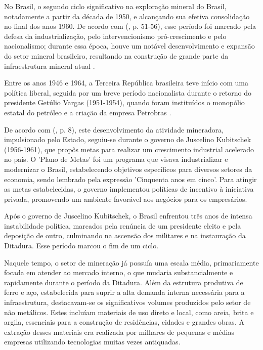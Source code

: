 No Brasil, o segundo ciclo significativo na exploração mineral do Brasil, notadamente a partir da década de 1950, e alcançando sua efetiva consolidação no final dos anos 1960. De acordo com \citeauthor{fonseca2012progresso} (\citeyear{fonseca2012progresso}, p. 51-56), esse período foi marcado pela defesa da industrialização, pelo intervencionismo pró-crescimento e pelo nacionalismo; durante essa época, houve um notável desenvolvimento e expansão do setor mineral brasileiro, resultando na construção de grande parte da infraestrutura mineral atual \cite[p. 5]{barreto2001mineracao}.

Entre os anos 1946 e 1964, a Terceira República brasileira teve início com uma política liberal, seguida por um breve período nacionalista durante o retorno do presidente Getúlio Vargas (1951-1954), quando foram instituídos o monopólio estatal do petróleo e a criação da empresa Petrobras \cite{villasboas1995mineracao}.

De acordo com \citeauthor{domingues2022historia} (\citeyear{domingues2022historia}, p. 8), este desenvolvimento da atividade mineradora, impulsionado pelo Estado, seguiu-se durante o governo de Juscelino Kubitschek (1956-1961), que propôs metas para realizar um crescimento industrial acelerado no país. O 'Plano de Metas' foi um programa que visava industrializar e modernizar o Brasil, estabelecendo objetivos específicos para diversos setores da economia, sendo lembrado pela expressão 'Cinquenta anos em cinco'. Para atingir as metas estabelecidas, o governo implementou políticas de incentivo à iniciativa privada, promovendo um ambiente favorável aos negócios para os empresários.

Após o governo de Juscelino Kubitschek, o Brasil enfrentou três anos de intensa instabilidade política, marcados pela renúncia de um presidente eleito e pela deposição de outro, culminando na ascensão dos militares e na instauração da Ditadura. Esse período marcou o fim de um ciclo.

Naquele tempo, o setor de mineração já possuía uma escala média, primariamente focada em atender ao mercado interno, o que mudaria substancialmente e rapidamente durante o período da Ditadura. Além da estrutura produtiva de ferro e aço, estabelecida para suprir a alta demanda interna necessária para a infraestrutura, destacavam-se os significativos volumes produzidos pelo setor de não metálicos. Estes incluíam materiais de uso direto e local, como areia, brita e argila, essenciais para a construção de residências, cidades e grandes obras. A extração desses materiais era realizada por milhares de pequenas e
médias empresas utilizando tecnologias muitas vezes antiquadas.

